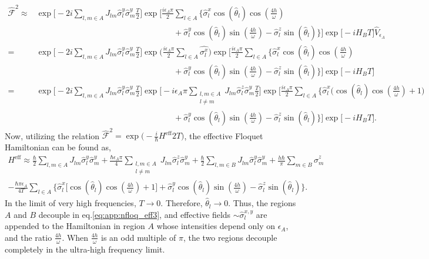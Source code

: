 \documentclass[%
nofootinbib,
reprint,
superscriptaddress,
amsmath,amssymb,showkeys,
aps,
prb,
]{revtex4-2}
\begin{document}
	\begin{align}		
		\hat{\mathcal{F}}^2 	\approx& \exp\Bigg[-2i  \sum_{l,m\in A}J_{lm} \hat{\sigma}^y_l\hat{\sigma}^y_m\frac{T}{2}\Bigg]\exp\Bigg[\frac{i \epsilon_A \pi}{2}\sum_{l\in A}\Big\{\hat{\sigma}^x_l \cos(\hat{\theta}_l)\cos(\frac{4h}{\omega})\nonumber\\
		&\hspace{7cm}+ \hat{\sigma}^y_l \cos(\hat{\theta}_l)\sin(\frac{4h}{\omega})-\hat{\sigma}^z_l \sin(\hat{\theta}_l)\Big\}\Bigg] \exp\big[-i H_B T\big]\hat{V}_{\epsilon_A}\nonumber\\
		=&\exp\Bigg[-2i \sum_{l,m\in A}J_{lm} \hat{\sigma}_l^y\hat{\sigma}_m^y\frac{T}{2}\Bigg] \exp\Big(\frac{i\epsilon_A \pi}{2}\sum_{l\in A}\hat{\sigma^x_l}\Big) \exp\Bigg[\frac{i \epsilon_A \pi}{2}\sum_{l\in A}\Big\{\hat{\sigma}^x_l \cos(\hat{\theta}_l)\cos(\frac{4h}{\omega})\nonumber\\
		&\hspace{ 7cm}  +\hat{\sigma}^y_l \cos(\hat{\theta}_l)\sin(\frac{4h}{\omega})-\hat{\sigma}^z_l \sin(\hat{\theta}_l)\Big\}\Bigg]\exp\big[-i H_B T\big]\nonumber\\
		=&\exp\Bigg[-2i\sum_{l,m\in A}J_{lm}\hat{\sigma}^y_l\hat{\sigma}^y_m \frac{T}{2}\Bigg] \exp\Bigg[-i\epsilon_A \pi \sum_{\substack{l,m \in A\\l\neq m}}J_{lm} \hat{\sigma}^z_l\hat{\sigma}^y_m\frac{T}{2}\Bigg] \exp\Bigg[\frac{i \epsilon_A \pi}{2}\sum_{l\in A}\Bigg\{\hat{\sigma}^x_l\Bigg( \cos(\hat{\theta}_l)\cos(\frac{4h}{\omega})+1\Bigg)\nonumber\\
		&\hspace{7cm} +\hat{\sigma}^y_l \cos(\hat{\theta}_l)\sin(\frac{4h}{\omega})-\hat{\sigma}^z_l \sin(\hat{\theta}_l)\Bigg\}\Bigg] \exp\big[-i H_B T\big].
		\label{eq:floq_couple1}
	\end{align}
	Now, utilizing the relation $\displaystyle \hat{\mathcal{F}}^2 = \exp\Big(-\frac{i}{\hbar}H^{\mathrm{eff}}2T\Big)$, the effective Floquet Hamiltonian can be found as,
	\begin{multline}
		H^{\mathrm{eff}} \approx\frac{\hbar}{2} \sum_{l,m\in A}J_{lm}\hat{\sigma}_l^y\hat{\sigma}_m^y +\frac{\hbar \epsilon_A \pi}{4} \sum_{\substack{l,m\in A\\l\neq m}} J_{lm}\hat{\sigma}^z_l\hat{\sigma}^y_m + \frac{\hbar}{2}\sum_{l,m\in B}J_{lm}\hat{\sigma}_l^y \hat{\sigma}_m^y + \frac{h\hbar}{\pi}\sum_{m \in B}\hat{\sigma}^z_m \\ -\frac{\hbar \pi \epsilon_A}{4T}\sum_{l\in A}\Bigg\{\hat{\sigma}^x_l \bigg[\cos(\hat{\theta}_l)\cos(\frac{4h}{\omega})+1 \bigg] + \hat{\sigma}^y_l \cos(\hat{\theta}_l)\sin(\frac{4h}{\omega})-\hat{\sigma}^z_l \sin(\hat{\theta}_l)\Bigg\}.
		\label{eq:app:nfloq_eff3}
	\end{multline}
	In the limit of very high frequencies, $T\rightarrow 0$. Therefore,  $\hat{\theta}_l \rightarrow 0$. Thus, the regions $A$ and $B$ decouple in eq.\eqref{eq:app:nfloq_eff3}, and effective fields $\sim \hat{\sigma}^{x,y}_l$ are appended to the Hamiltonian in region $A$ whose intensities depend only on $\epsilon_A$, and the ratio $\frac{4h}{\omega}$. When $\frac{4h}{\omega}$ is an odd multiple of $\pi$, the two regions decouple completely in the ultra-high frequency limit.
	
	
	
\end{document}
